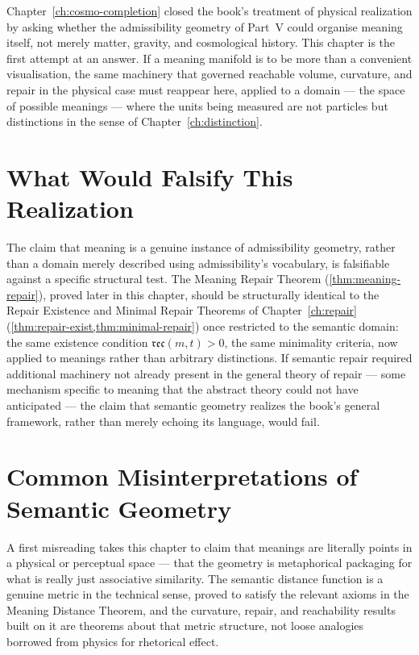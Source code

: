 \documentclass[12pt,twoside,openright]{book}
\newcommand{\reco}{\mathfrak{rec}}
\begin{document}
Chapter~\ref{ch:cosmo-completion} closed the book's treatment
of physical realization by asking whether the admissibility
geometry of Part~V could organise meaning itself, not merely
matter, gravity, and cosmological history. This chapter is
the first attempt at an answer. If a meaning manifold is to
be more than a convenient visualisation, the same machinery
that governed reachable volume, curvature, and repair in the
physical case must reappear here, applied to a domain --- the
space of possible meanings --- where the units being measured
are not particles but distinctions in the sense of
Chapter~\ref{ch:distinction}.

\section{What Would Falsify This Realization}
\label{sec:ch20-falsifiability}

The claim that meaning is a genuine instance of admissibility
geometry, rather than a domain merely described using
admissibility's vocabulary, is falsifiable against a specific
structural test. The Meaning Repair Theorem
(\cref{thm:meaning-repair}), proved later in this chapter,
should be structurally identical to the Repair Existence and
Minimal Repair Theorems of Chapter~\ref{ch:repair}
(\cref{thm:repair-exist,thm:minimal-repair}) once restricted
to the semantic domain: the same existence condition
$\reco(m,t)>0$, the same minimality criteria, now applied to
meanings rather than arbitrary distinctions. If semantic
repair required additional machinery not already present in
the general theory of repair --- some mechanism specific to
meaning that the abstract theory could not have anticipated
--- the claim that semantic geometry realizes the book's
general framework, rather than merely echoing its language,
would fail.

\section{Common Misinterpretations of Semantic Geometry}
\label{sec:ch20-misinterpretations}

A first misreading takes this chapter to claim that meanings
are literally points in a physical or perceptual space ---
that the geometry is metaphorical packaging for what is
really just associative similarity. The semantic distance
function is a genuine metric in the technical sense, proved
to satisfy the relevant axioms in the Meaning Distance
Theorem, and the curvature, repair, and reachability results
built on it are theorems about that metric structure, not
loose analogies borrowed from physics for rhetorical effect.
\end{document}

